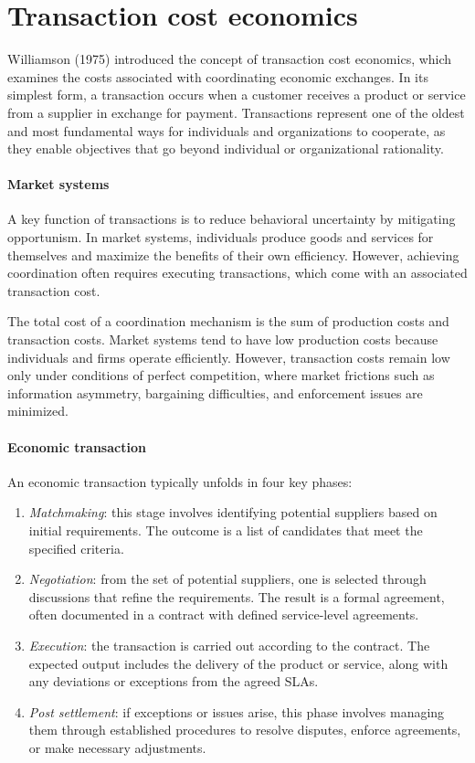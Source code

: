 \section{Transaction cost economics}

Williamson (1975) introduced the concept of transaction cost economics, which examines the costs associated with coordinating economic exchanges. 
In its simplest form, a transaction occurs when a customer receives a product or service from a supplier in exchange for payment. 
Transactions represent one of the oldest and most fundamental ways for individuals and organizations to cooperate, as they enable objectives that go beyond individual or organizational rationality.

\paragraph*{Market systems}
A key function of transactions is to reduce behavioral uncertainty by mitigating opportunism. 
In market systems, individuals produce goods and services for themselves and maximize the benefits of their own efficiency. 
However, achieving coordination often requires executing transactions, which come with an associated transaction cost.

The total cost of a coordination mechanism is the sum of production costs and transaction costs. 
Market systems tend to have low production costs because individuals and firms operate efficiently. 
However, transaction costs remain low only under conditions of perfect competition, where market frictions such as information asymmetry, bargaining difficulties, and enforcement issues are minimized.

\paragraph*{Economic transaction}
An economic transaction typically unfolds in four key phases:
\begin{enumerate}
    \item \textit{Matchmaking}: this stage involves identifying potential suppliers based on initial requirements. 
        The outcome is a list of candidates that meet the specified criteria.
    \item \textit{Negotiation}: from the set of potential suppliers, one is selected through discussions that refine the requirements. 
        The result is a formal agreement, often documented in a contract with defined service-level agreements.
    \item \textit{Execution}: the transaction is carried out according to the contract. 
        The expected output includes the delivery of the product or service, along with any deviations or exceptions from the agreed SLAs.
    \item \textit{Post settlement}: if exceptions or issues arise, this phase involves managing them through established procedures to resolve disputes, enforce agreements, or make necessary adjustments.
\end{enumerate}

